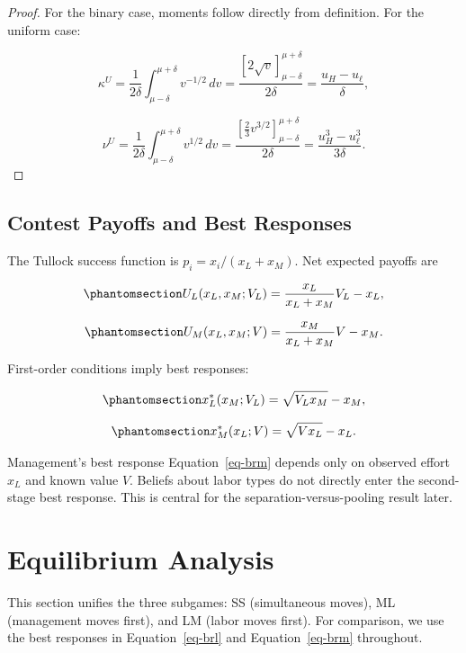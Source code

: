 \documentclass[
  english,
  a4paper,
  12pt]{article}
\theoremstyle{plain}
\theoremstyle{plain}
\theoremstyle{definition}
\theoremstyle{remark}
\begin{document}
\begin{proof}
For the binary case, moments follow directly from definition. For the
uniform case:

\[
\kappa^U
=\frac{1}{2\delta}\int_{\mu-\delta}^{\mu+\delta} v^{-1/2}\,dv
=\frac{[2\sqrt v]_{\mu-\delta}^{\mu+\delta}}{2\delta}
=\frac{u_H-u_\ell}{\delta},
\]

\[
\nu^U
=\frac{1}{2\delta}\int_{\mu-\delta}^{\mu+\delta} v^{1/2}\,dv
=\frac{[\tfrac{2}{3}v^{3/2}]_{\mu-\delta}^{\mu+\delta}}{2\delta}
=\frac{u_H^3-u_\ell^3}{3\delta}.
\]
\end{proof}

\subsection{Contest Payoffs and Best
Responses}\label{contest-payoffs-and-best-responses}

The Tullock success function is \(p_i=x_i/(x_L+x_M)\). Net expected
payoffs are

\begin{equation}\phantomsection\label{eq-ul}{
U_L(x_L,x_M;V_L)=\frac{x_L}{x_L+x_M}V_L-x_L,
}\end{equation}

\begin{equation}\phantomsection\label{eq-um}{
U_M(x_L,x_M;V)=\frac{x_M}{x_L+x_M}V-x_M.
}\end{equation}

First-order conditions imply best responses:

\begin{equation}\phantomsection\label{eq-brl}{
x_L^*(x_M;V_L)=\sqrt{V_Lx_M}-x_M,
}\end{equation}

\begin{equation}\phantomsection\label{eq-brm}{
x_M^*(x_L;V)=\sqrt{Vx_L}-x_L.
}\end{equation}

Management's best response Equation~\ref{eq-brm} depends only on
observed effort \(x_L\) and known value \(V\). Beliefs about labor types
do not directly enter the second-stage best response. This is central
for the separation-versus-pooling result later.

\section{Equilibrium Analysis}\label{sec-equilibria}

This section unifies the three subgames: SS (simultaneous moves), ML
(management moves first), and LM (labor moves first). For comparison, we
use the best responses in Equation~\ref{eq-brl} and
Equation~\ref{eq-brm} throughout.
\end{document}
